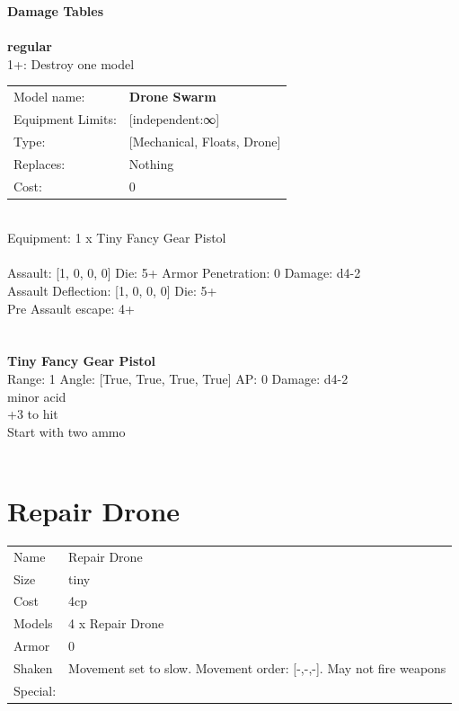 {\bf Damage Tables} \\
\ \\ {\bf regular } \\
1+: Destroy one model \\


\noindent
\begin{tabular}{ll}
Model name: &{\bf Drone Swarm } \\
Equipment Limits: &[independent:∞] \\
Type: &[Mechanical, Floats, Drone] \\
Replaces: &Nothing \\
Cost: & 0\\
\end{tabular}
\ \\
Equipment: 1 x Tiny Fancy Gear Pistol \\
\ \\
Assault: [1, 0, 0, 0] Die: 5+ Armor Penetration: 0 Damage: d4-2 \\
Assault Deflection: [1, 0, 0, 0] Die: 5+\\
\indent Pre Assault escape: 4+\\ 
 
\ \\

\ \\
{\bf Tiny Fancy Gear Pistol } \\



Range: 1  Angle: [True, True, True, True] AP: 0 Damage: d4-2 \\
minor acid\\ 
+3 to hit\\ 
Start with two ammo\\ 




 
\ \\













\clearpage

\section{ Repair Drone }

\begin{tabular}{ll}
  Name & Repair Drone \\
  Size & tiny\\
  Cost & 4cp\\
  Models & 4 x Repair Drone\\
  Armor & 0\\
  Shaken & Movement set to slow. Movement order: [-,-,-]. May not fire weapons\\
  Special: \\
\end{tabular}

